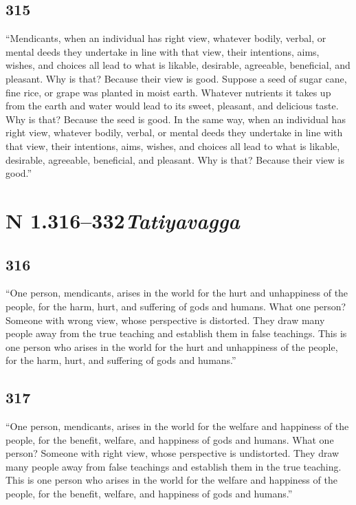 \documentclass[12pt,openany]{book}%
\newcommand*{\suttatitleacronym}[1]{\smaller[2]{#1}\vspace*{.3em}}
\newcommand*{\suttatitleroot}[1]{\linebreak\smaller[2]\itshape{#1}}
\newcommand*{\tocacronym}[1]{\hspace*{-3.3em}{#1}\quad}
\newcommand*{\tocroot}[1]{(\textit{#1})}
\begin{document}
\subsection*{315 }

“Mendicants, when an individual has right view, whatever bodily, verbal, or mental deeds they undertake in line with that view, their intentions, aims, wishes, and choices all lead to what is likable, desirable, agreeable, beneficial, and pleasant. Why is that? Because their view is good. Suppose a seed of sugar cane, fine rice, or grape was planted in moist earth. Whatever nutrients it takes up from the earth and water would lead to its sweet, pleasant, and delicious taste. Why is that? Because the seed is good. In the same way, when an individual has right view, whatever bodily, verbal, or mental deeds they undertake in line with that view, their intentions, aims, wishes, and choices all lead to what is likable, desirable, agreeable, beneficial, and pleasant. Why is that? Because their view is good.” 

%
\section*{{\suttatitleacronym AN 1.316–332}{\suttatitleroot Tatiyavagga}}
\addcontentsline{toc}{section}{\tocacronym{AN 1.316–332} \tocroot{Tatiyavagga}}

\subsection*{316 }

“One person, mendicants, arises in the world for the hurt and unhappiness of the people, for the harm, hurt, and suffering of gods and humans. What one person? Someone with wrong view, whose perspective is distorted. They draw many people away from the true teaching and establish them in false teachings. This is one person who arises in the world for the hurt and unhappiness of the people, for the harm, hurt, and suffering of gods and humans.” 

\subsection*{317 }

“One person, mendicants, arises in the world for the welfare and happiness of the people, for the benefit, welfare, and happiness of gods and humans. What one person? Someone with right view, whose perspective is undistorted. They draw many people away from false teachings and establish them in the true teaching. This is one person who arises in the world for the welfare and happiness of the people, for the benefit, welfare, and happiness of gods and humans.” 
\end{document}
